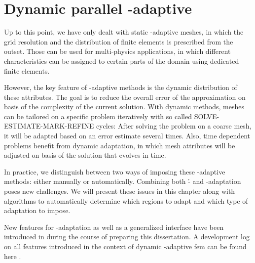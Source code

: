 \chapter{Dynamic parallel \hp-adaptive }
\label{ch:dynamic}
\glsresetall

Up to this point, we have only dealt with static \hp-adaptive meshes, in which the grid resolution and the distribution of finite elements is prescribed from the outset. Those can be used for multi-physics applications, in which different characteristics can be assigned to certain parts of the domain using dedicated finite elements.

However, the key feature of \hp-adaptive methods is the dynamic distribution of these attributes. The goal is to reduce the overall error of the approximation on basis of the complexity of the current solution. With dynamic methods, meshes can be tailored on a specific problem iteratively with so called SOLVE-ESTIMATE-MARK-REFINE cycles: After solving the problem on a coarse mesh, it will be adapted based on an error estimate several times. Also, time dependent problems benefit from dynamic adaptation, in which mesh attributes will be adjusted on basis of the solution that evolves in time.

In practice, we distinguish between two ways of imposing these \hp-adaptive methods: either manually or automatically. Combining both \h- and \p-adaptation poses new challenges. We will present these issues in this chapter along with algorithms to automatically determine which regions to adapt and which type of adaptation to impose.

New features for \hp-adaptation as well as a generalized interface have been introduced in \dealii{} during the course of preparing this dissertation. A development log on all features introduced in the context of dynamic \hp-adaptive \gls{fem} can be found here \cite{dealiiissue7515}.





